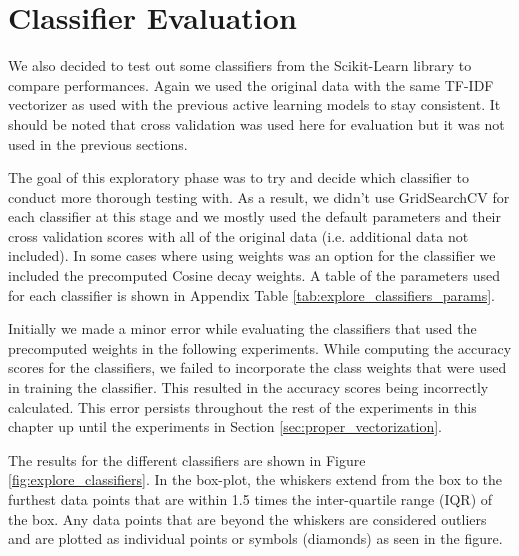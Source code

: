 \section{Classifier Evaluation}

We also decided to test out some classifiers from the Scikit-Learn library to compare performances. Again we used the original data with the same TF-IDF vectorizer as used with the previous active learning models to stay consistent. It should be noted that cross validation was used here for evaluation but it was not used in the previous sections.

The goal of this exploratory phase was to try and decide which classifier to conduct more thorough testing with. As a result, we didn't use GridSearchCV for each classifier at this stage and we mostly used the default parameters and their cross validation scores with all of the original data (i.e. additional data not included). In some cases where using weights was an option for the classifier we included the precomputed Cosine decay weights. A table of the parameters used for each classifier is shown in Appendix Table \ref{tab:explore_classifiers_params}.

Initially we made a minor error while evaluating the classifiers that used the precomputed weights in the following experiments. While computing the accuracy scores for the classifiers, we failed to incorporate the class weights that were used in training the classifier. This resulted in the accuracy scores being incorrectly calculated. This error persists throughout the rest of the experiments in this chapter up until the experiments in Section \ref{sec:proper_vectorization}.

The results for the different classifiers are shown in Figure \ref{fig:explore_classifiers}. In the box-plot, the whiskers extend from the box to the furthest data points that are within 1.5 times the inter-quartile range (IQR) of the box. Any data points that are beyond the whiskers are considered outliers and are plotted as individual points or symbols (diamonds) as seen in the figure.

